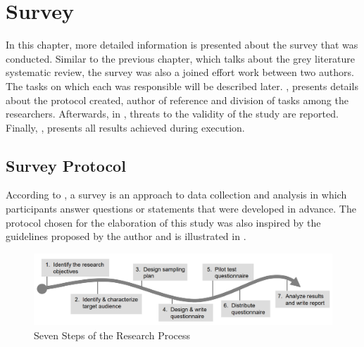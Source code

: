 
\chapter{Survey}\label{survey}

In this chapter, more detailed information is presented about the survey that was conducted. Similar to the previous chapter, which talks about the grey literature systematic review, the survey was also a joined effort work between two authors. The tasks on which each was responsible will be described later. , presents details about the protocol created, author of reference and division of tasks among the researchers. Afterwards, in , threats to the validity of the study are reported. Finally, , presents all results achieved during execution.

\section{Survey Protocol}\label{sec:survey-protocol}

According to , a survey is an approach to data collection and analysis in which participants answer questions or statements that were developed in advance. The protocol chosen for the elaboration of this study was also inspired by the guidelines proposed by the author and is illustrated in .

\begin{figure}[!htb]
  \caption{Seven Steps of the Research Process}\label{fig:setepassos}
  \begin{center}
    \includegraphics[width=16cm]{img/5-kasunic-process.png}
  \end{center}
\end{figure}

